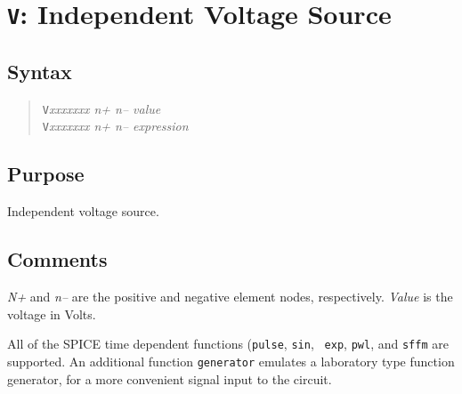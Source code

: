 \section{{\tt V}: Independent Voltage Source}
\subsection{Syntax}
\begin{verse}
{\tt V}{\it xxxxxxx n+ n-- value}\\
{\tt V}{\it xxxxxxx n+ n-- expression}
\end{verse}
\subsection{Purpose}

Independent voltage source.
\subsection{Comments}

{\it N+} and {\it n--} are the positive and negative element nodes,
respectively.  {\it Value} is the voltage in Volts.

All of the SPICE time dependent functions ({\tt pulse}, {\tt sin}, {\tt
exp}, {\tt pwl}, and {\tt sffm} are supported.  An additional
function {\tt generator} emulates a laboratory type function generator, for
a more convenient signal input to the circuit.
